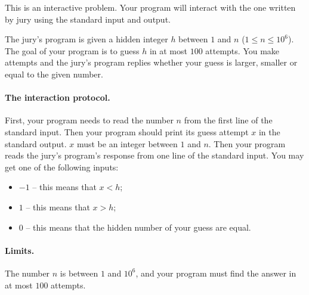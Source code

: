This is an interactive problem.
Your program will interact with the one written by jury using the standard input and output.

The jury’s program is given a hidden integer $h$ between $1$ and $n$ ($1 \leq n \leq 10^6$).
The goal of your program is to guess $h$ in at most $100$ attempts.
You make attempts and the jury's program replies whether your guess is larger, smaller or equal to the given number.

\paragraph{The interaction protocol.}
First, your program needs to read the number $n$ from the first line of the standard input.
Then your program should print its guess attempt $x$ in the standard output.
$x$ must be an integer between $1$ and $n$.
Then your program reads the jury’s program’s response from one line of the standard input.
You may get one of the following inputs:
\begin{itemize}
    \item $-1$ -- this means that $x < h$;
    \item $1$ -- this means that $x > h$;
    \item $0$ -- this means that the hidden number of your guess are equal.
\end{itemize}

\paragraph{Limits.}
The number $n$ is between $1$ and $10^6$, and your program must find the answer in at most $100$ attempts.

{
\renewcommand{\sampleinputname}{Jury's feedback}
\renewcommand{\sampleoutputname}{Your attempts}
}
